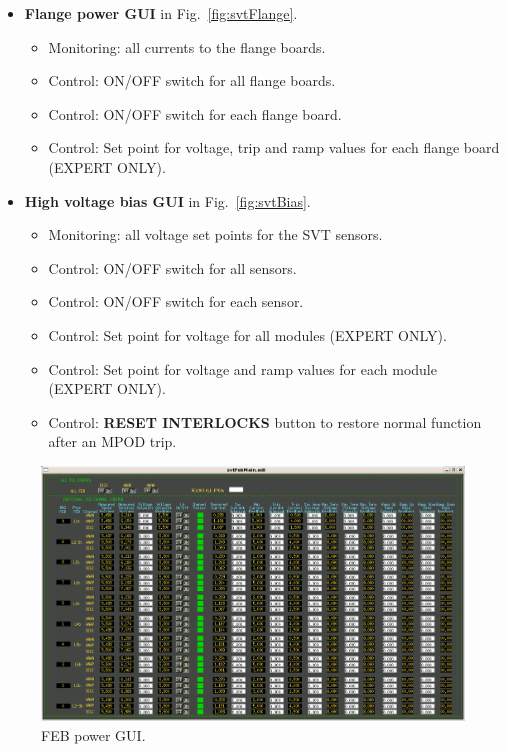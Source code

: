 \documentclass[12pt]{report}
\begin{document}
\begin{itemize}
\item \textbf{Flange power GUI} in Fig.~\ref{fig:svtFlange}.
\begin{itemize}
\item Monitoring: all  currents to the flange boards. 
\item Control: ON/OFF switch for all flange boards. 
\item Control: ON/OFF switch for each flange board. 
\item Control: Set point for voltage, trip and ramp values for each flange board (EXPERT ONLY).
\end{itemize}

\item \textbf{High voltage bias GUI} in Fig.~\ref{fig:svtBias}.
\begin{itemize}
\item Monitoring: all voltage set points for the SVT sensors.
\item Control: ON/OFF switch for all sensors.
\item Control: ON/OFF switch for each sensor.
\item Control: Set point for voltage for all modules (EXPERT ONLY).
\item Control: Set point for voltage and ramp values for each module (EXPERT ONLY).
\item Control: \textbf{RESET INTERLOCKS} button to restore normal function after an MPOD trip.
\end{itemize}



\end{itemize}

\begin{figure}[h!t]
\centering
\includegraphics[width=14cm]{svtFebMain.png}
\caption{FEB power GUI. \label{fig:svtFebMain}}
\end{figure}
\end{document}
